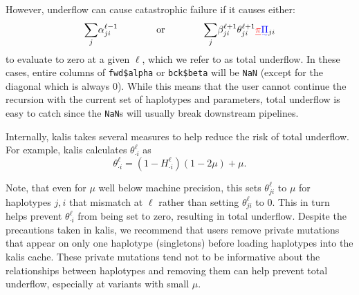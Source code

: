 \documentclass[a4paper]{article}
\newcommand{\pkg}[1]{{\fontseries{m}\fontseries{b}\selectfont #1}}
\providecommand{\DIFadd}[1]{{\protect\color{blue}\uwave{#1}}} %
\providecommand{\DIFdel}[1]{{\protect\color{red}\sout{#1}}}                      %
\providecommand{\DIFaddbegin}{} %
\providecommand{\DIFaddend}{} %
\providecommand{\DIFdelbegin}{} %
\providecommand{\DIFdelend}{} %
\newcommand{\DIFscaledelfig}{0.5}
\newlength{\DIFdelgraphicswidth} %
\newlength{\DIFdelgraphicsheight} %
\newcommand{\DIFaddincludegraphics}[2][]{{\color{blue}\fbox{\DIFOincludegraphics[#1]{#2}}}} %
\newcommand{\DIFdelincludegraphics}[2][]{%
\sbox{\DIFdelgraphicsbox}{\DIFOincludegraphics[#1]{#2}}%
\settoboxwidth{\DIFdelgraphicswidth}{\DIFdelgraphicsbox} %
\settoboxtotalheight{\DIFdelgraphicsheight}{\DIFdelgraphicsbox} %
\scalebox{\DIFscaledelfig}{%
\parbox[b]{\DIFdelgraphicswidth}{\usebox{\DIFdelgraphicsbox}\\[-\baselineskip] \rule{\DIFdelgraphicswidth}{0em}}\llap{\resizebox{\DIFdelgraphicswidth}{\DIFdelgraphicsheight}{%
\setlength{\unitlength}{\DIFdelgraphicswidth}%
\begin{picture}(1,1)%
\thicklines\linethickness{2pt} %
{\color[rgb]{1,0,0}\put(0,0){\framebox(1,1){}}}%
{\color[rgb]{1,0,0}\put(0,0){\line( 1,1){1}}}%
{\color[rgb]{1,0,0}\put(0,1){\line(1,-1){1}}}%
\end{picture}%
}\hspace*{3pt}}} %
} %
\DeclareRobustCommand{\DIFaddbegin}{\DIFOaddbegin \let\includegraphics\DIFaddincludegraphics} %
\DeclareRobustCommand{\DIFaddend}{\DIFOaddend \let\includegraphics\DIFOincludegraphics} %
\DeclareRobustCommand{\DIFdelbegin}{\DIFOdelbegin \let\includegraphics\DIFdelincludegraphics} %
\DeclareRobustCommand{\DIFdelend}{\DIFOaddend \let\includegraphics\DIFOincludegraphics} %
\begin{document}
However, underflow can cause catastrophic failure if it causes either:
\[ \underset{j}{\sum} \alpha_{ji}^{\ell-1} \qquad\qquad \mbox{or} \qquad\qquad \underset{j}{\sum} \beta_{ji}^{\ell+1}\theta_{ji}^{\ell+1} \DIFdelbegin \DIFdel{\pi}\DIFdelend \DIFaddbegin \DIFadd{\Pi}\DIFaddend _{ji}\]
to evaluate to zero at a given \(\ell\), which we refer to as total underflow.
In these cases, entire columns of \texttt{fwd\$alpha} or \texttt{bck\$beta} will be \texttt{NaN} (except for the diagonal which is always 0).
While this means that the user cannot continue the recursion with the current set of haplotypes and parameters, total underflow is easy to catch since the \texttt{NaN}s will usually break downstream pipelines.

Internally, \pkg{kalis} takes several measures to help reduce the risk of total underflow.
For example, \pkg{kalis} calculates \(\theta_{\cdot i}^{\ell}\) as
\[
	\theta_{\cdot i}^{\ell} = \left(1 - H_{\cdot i}^{\ell}\right) \left(1-2\mu\right) + \mu .
\]

Note, that even for \(\mu\) well below machine precision, this sets \(\theta_{j i}^{\ell}\) to \(\mu\) for haplotypes \(j,i\) that mismatch at \(\ell\) rather than setting \(\theta_{j i}^{\ell}\) to 0.
This in turn helps prevent \(\theta_{\cdot i}^{\ell}\) from being set to zero, resulting in total underflow.
Despite the precautions taken in \pkg{kalis}, we recommend that users remove private mutations that appear on only one haplotype (singletons) before loading haplotypes into the \pkg{kalis} cache.
These private mutations tend not to be informative about the relationships between haplotypes and removing them can help prevent total underflow, especially at variants with small \(\mu\).
\end{document}
